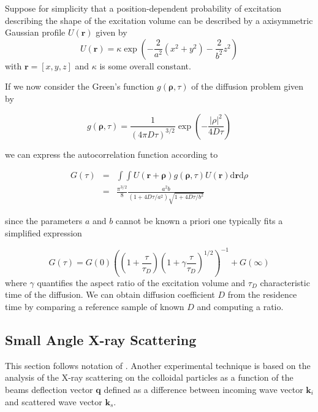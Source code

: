 \documentclass{doctoral}
\newcommand{\dd}{\mathrm{d}}
\begin{document}
Suppose for simplicity that a position-dependent probability of excitation describing the shape of the excitation volume can be described by a axisymmetric Gaussian profile $U(\bm{r})$ given by
\begin{equation}
    U(\bm{r}) = \kappa \exp\left( - \frac{2}{a^2} \left( x^2 + y^2 \right) - \frac{2}{b^2} z^2 \right) \label{eqn:excitation_profile}
\end{equation}
with $\bm{r} = [x,y,z]$ and $\kappa$ is some overall constant.

If we now consider the Green's function $g(\bm{\rho},\tau)$ of the diffusion problem given by 

\begin{equation}
    g(\bm{\rho},\tau) = \frac{1}{(4\pi D \tau)^{3/2}} \exp\left( - \frac{|\rho|^2}{4 D \tau}\right)
\end{equation}

we can express the autocorrelation function according to 

\begin{eqnarray}
    G(\tau) & = & \int \int U(\bm{r} + \bm{\rho}) g(\bm{\rho},\tau) U(\bm{r}) \dd \bm{r} \dd \rho                \\
            & = & \frac{\pi^{3/2}}{8} \frac{a^2 b}{(1+4 D \tau / a^2)\sqrt{1+4D\tau/b^2}} \label{eqn:fcs_theory}
\end{eqnarray}

since the parameters $a$ and $b$ cannot be known a priori one typically fits a simplified expression 

\begin{equation}
    G(\tau) = G(0) \left( \left(1+\frac{\tau}{\tau_D}\right) \left(1 + \gamma \frac{\tau}{\tau_D}\right)^{1/2} \right)^{-1} + G(\infty) \label{eqn:fcs-autocorrelation}
\end{equation}
where $\gamma$ quantifies the aspect ratio of the excitation volume and $\tau_D$ characteristic time of the diffusion.
We can obtain diffusion coefficient $D$ from the residence time by comparing a reference sample of known $D$ and computing a ratio.

\subsection{Small Angle X-ray Scattering}
\label{sec:SAXS}

This section follows notation of \textcite{Hermann_2008}.
Another experimental technique is based on the analysis of the X-ray scattering on the colloidal particles as a function of the beams deflection vector $\bm{q}$ defined as a difference between incoming wave vector $\bm{k}_i$ and scattered wave vector $\bm{k}_s$.
\end{document}
